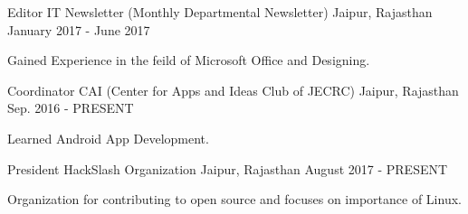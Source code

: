 \begin{cventries}
  \cventry
    {Editor}
    {IT Newsletter (Monthly Departmental Newsletter)}
    {Jaipur, Rajasthan}
    {January 2017 - June 2017}
    {
      \begin{cvitems}
        \item {Gained Experience in the feild of Microsoft Office and Designing.}
      \end{cvitems}
    }
  \cventry
    {Coordinator}
    {CAI (Center for Apps and Ideas Club of JECRC)}
    {Jaipur, Rajasthan}
    {Sep. 2016 - PRESENT}
    {
      \begin{cvitems}
        \item {Learned Android App Development.}
      \end{cvitems}
    }
    
  \cventry
    {President}
    {HackSlash Organization}
    {Jaipur, Rajasthan}
    {August 2017 - PRESENT}
    {
      \begin{cvitems}
        \item {Organization for contributing to open source and focuses on importance of Linux.}
      \end{cvitems}
    }
 
\end{cventries}